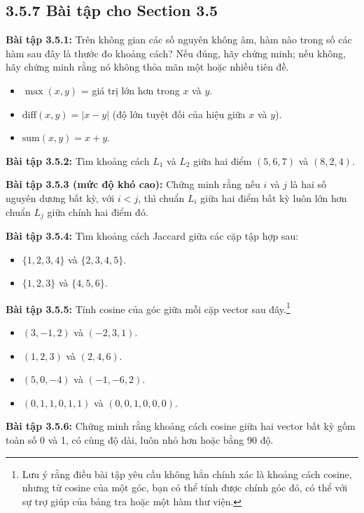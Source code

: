 \subsection*{3.5.7 Bài tập cho Section 3.5}

\textbf{Bài tập 3.5.1:} Trên không gian các số nguyên không âm, hàm nào trong số các hàm sau đây là thước đo khoảng cách? Nếu đúng, hãy chứng minh; nếu không, hãy chứng minh rằng nó không thỏa mãn một hoặc nhiều tiên đề.
\begin{itemize}
  \item[(a)] $\max(x,y)$ = giá trị lớn hơn trong $x$ và $y$.
  \item[(b)] $\text{diff}(x,y) = |x-y|$ (độ lớn tuyệt đối của hiệu giữa $x$ và $y$).
  \item[(c)] $\text{sum}(x,y) = x+y$.
\end{itemize}

\textbf{Bài tập 3.5.2:} Tìm khoảng cách $L_1$ và $L_2$ giữa hai điểm $(5,6,7)$ và $(8,2,4)$.

\textbf{Bài tập 3.5.3 (mức độ khó cao):} Chứng minh rằng nếu $i$ và $j$ là hai số nguyên dương bất kỳ, với $i<j$, thì chuẩn $L_i$ giữa hai điểm bất kỳ luôn lớn hơn chuẩn $L_j$ giữa chính hai điểm đó.

\textbf{Bài tập 3.5.4:} Tìm khoảng cách Jaccard giữa các cặp tập hợp sau:
\begin{itemize}
  \item[(a)] $\{1,2,3,4\}$ và $\{2,3,4,5\}$.
  \item[(b)] $\{1,2,3\}$ và $\{4,5,6\}$.
\end{itemize}

\textbf{Bài tập 3.5.5:} Tính cosine của góc giữa mỗi cặp vector sau đây.\footnote{Lưu ý rằng điều bài tập yêu cầu không hẳn chính xác là khoảng cách cosine, nhưng từ cosine của một góc, bạn có thể tính được chính góc đó, có thể với sự trợ giúp của bảng tra hoặc một hàm thư viện.}
\begin{itemize}
  \item[(a)] $(3,-1,2)$ và $(-2,3,1)$.
  \item[(b)] $(1,2,3)$ và $(2,4,6)$.
  \item[(c)] $(5,0,-4)$ và $(-1,-6,2)$.
  \item[(d)] $(0,1,1,0,1,1)$ và $(0,0,1,0,0,0)$.
\end{itemize}

\textbf{Bài tập 3.5.6:} Chứng minh rằng khoảng cách cosine giữa hai vector bất kỳ gồm toàn số 0 và 1, có cùng độ dài, luôn nhỏ hơn hoặc bằng 90 độ.


